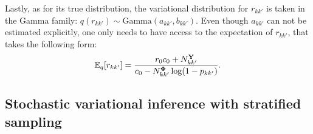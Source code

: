 Lastly, as for its true distribution, the variational distribution for $r_{kk'}$ is taken in the Gamma family:  $q(r_{kk'}) \sim \textrm{Gamma}(a_{kk'},b_{kk'})$. Even though $a_{kk'}$ can not be estimated explicitly, one only needs to have access to the expectation of $r_{kk'}$, that takes the following form:
\[
\mathbb{E}_{q}[r_{kk'}] = \frac{r_0c_0+N^{\mathbf{Y}}_{kk'}}{c_0  -N^{\boldsymbol{\Phi}}_{kk'}\log(1-p_{kk'})}.
\]
%

\subsection{Stochastic variational inference with stratified sampling}


